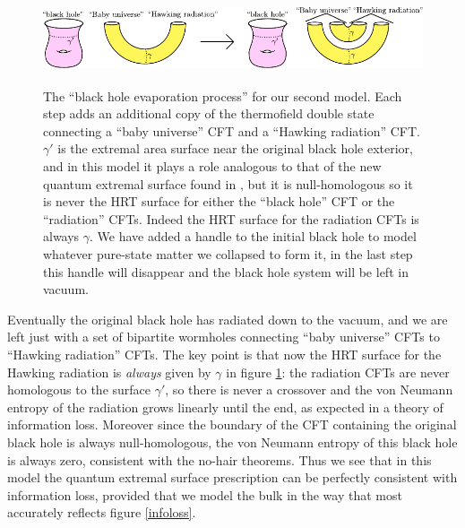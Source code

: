 \documentclass[12pt]{article}
\newcommand{\bfig}{\begin{figure}\begin{center}}
\newcommand{\efig}{\end{center}\end{figure}}
\theoremstyle{definition}
\begin{document}
\bfig
\includegraphics[height=2.7cm]{infoworm.pdf}
\caption{The ``black hole evaporation process'' for our second model.  Each step adds an additional copy of the thermofield double state connecting a ``baby universe'' CFT and a ``Hawking radiation'' CFT.  $\gamma'$ is the extremal area surface near the original black hole exterior, and in this model it plays a role analogous to that of the new quantum extremal surface found in \cite{Almheiri:2019psf,Penington:2019npb,Almheiri:2019hni}, but it is null-homologous so it is never the HRT surface for either the ``black hole'' CFT or the ``radiation'' CFTs.  Indeed the HRT surface for the radiation CFTs is always $\gamma$.  We have added a handle to the initial black hole to model whatever pure-state matter we collapsed to form it, in the last step this handle will disappear and the black hole system will be left in vacuum.}\label{infolossworm}
\efig
Eventually the original black hole has radiated down to the vacuum, and we are left just with a set of bipartite wormholes connecting ``baby universe'' CFTs to ``Hawking radiation'' CFTs.  The key point is that now the HRT surface for the Hawking radiation is \textit{always} given by $\gamma$ in figure \ref{infolossworm}: the radiation CFTs are never homologous to the surface $\gamma'$, so there is never a crossover and the von Neumann entropy of the radiation grows linearly until the end, as expected in a theory of information loss.  Moreover since the boundary of the CFT containing the original black hole is always null-homologous, the von Neumann entropy of this black hole is always zero, consistent with the no-hair theorems.  Thus we see that in this model the quantum extremal surface prescription can be perfectly consistent with information loss, provided that we model the bulk in the way that most accurately reflects figure \ref{infoloss}.
\end{document}
